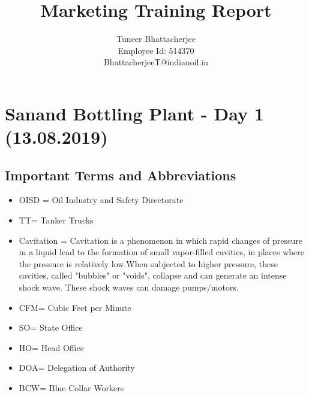 \documentclass{report}
\title{Marketing Training Report}
\author{Tuneer Bhattacherjee\\Employee Id: 514370\\BhattacherjeeT@indianoil.in}
\begin{document}
	\maketitle
	\pagebreak
	\tableofcontents
	\pagebreak
	\chapter{Sanand Bottling Plant - Day 1 (13.08.2019)}
	\section{Important Terms and Abbreviations}
	\begin{itemize}
		\item OISD = Oil Industry and Safety Directorate
		\item TT= Tanker Trucks
		\item Cavitation = Cavitation is a phenomenon in which rapid changes of pressure in a liquid lead to the formation of small vapor-filled cavities, in places where the pressure is relatively low.When subjected to higher pressure, these cavities, called "bubbles" or "voids", collapse and can generate an intense shock wave. These shock waves can damage pumps/motors.
		\item CFM= Cubic Feet per Minute
		\item SO= State Office
		\item HO= Head Office
		\item DOA= Delegation of Authority
		\item BCW= Blue Collar Workers
	\end{itemize}
\end{document}
